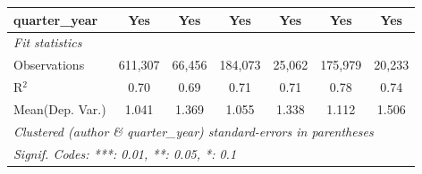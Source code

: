 \begin{tabular}{lcccccc}
   quarter\_year                         & Yes            & Yes           & Yes            & Yes           & Yes            & Yes\\  
   \midrule
   \emph{Fit statistics}\\
   Observations                          & 611,307        & 66,456        & 184,073        & 25,062        & 175,979        & 20,233\\  
   R$^2$                                 & 0.70           & 0.69          & 0.71           & 0.71          & 0.78           & 0.74\\  
Mean(Dep. Var.) & 1.041 & 1.369 & 1.055 & 1.338 & 1.112 & 1.506 \\
   \midrule \midrule
   \multicolumn{7}{l}{\emph{Clustered (author \& quarter\_year) standard-errors in parentheses}}\\
   \multicolumn{7}{l}{\emph{Signif. Codes: ***: 0.01, **: 0.05, *: 0.1}}\\
\end{tabular}
\par\endgroup
